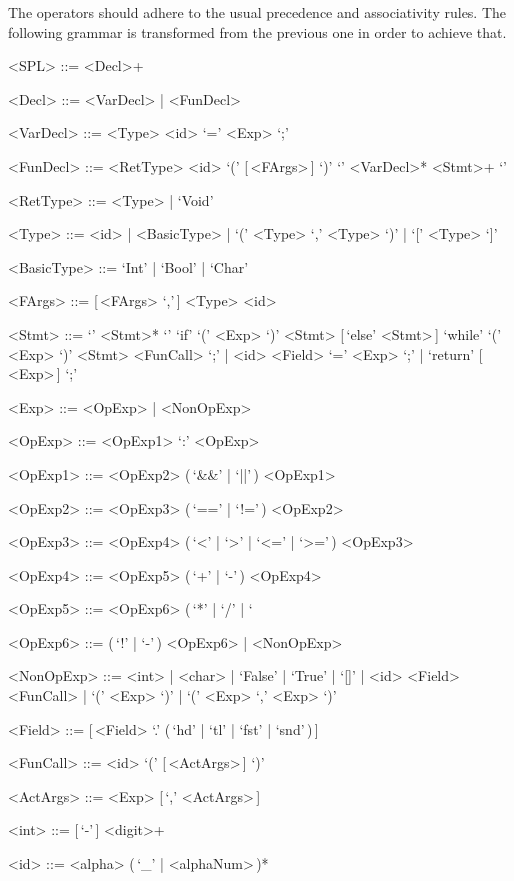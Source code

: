 \documentclass{article}
\begin{document}
The operators should adhere to the usual precedence and associativity rules.
The following grammar is transformed from the previous one in order to achieve that.
\setlength{\grammarindent}{7.1em}
\begin{grammar}
    <SPL> ::= <Decl>+

    <Decl> ::= <VarDecl> | <FunDecl>

    <VarDecl> ::= <Type> <id> `=' <Exp> `;'

    <FunDecl> ::= <RetType> <id> `(' [\,<FArgs>\,] `)' `{' <VarDecl>* <Stmt>+ `}'

    <RetType> ::= <Type> | `Void'

    <Type> ::= <id> | <BasicType> | `(' <Type> `,' <Type> `)' | `[' <Type> `]'

    <BasicType> ::= `Int' | `Bool' | `Char'

    <FArgs> ::= [\,<FArgs> `,'\,] <Type> <id>

    <Stmt> ::= `{' <Stmt>* `}'
    \alt `if' `(' <Exp> `)' <Stmt> [\,`else' <Stmt>\,]
    \alt `while' `(' <Exp> `)' <Stmt>
    \alt <FunCall> `;' | <id> <Field> `=' <Exp> `;' | `return' [\,<Exp>\,] `;'

    <Exp> ::= <OpExp> | <NonOpExp>

    <OpExp> ::= <OpExp1> `:' <OpExp>

    <OpExp1> ::= <OpExp2> (\,`&&' | `||'\,) <OpExp1>

    <OpExp2> ::= <OpExp3> (\,`==' | `!='\,) <OpExp2>

    <OpExp3> ::= <OpExp4> (\,`<' | `>' | `<=' | `>='\,) <OpExp3>

    <OpExp4> ::= <OpExp5> (\,`+' | `-'\,) <OpExp4>

    <OpExp5> ::= <OpExp6> (\,`*' | `/' | `%

    <OpExp6> ::= (\,`!' | `-'\,) <OpExp6> | <NonOpExp>

    <NonOpExp> ::= <int> | <char> | `False' | `True' | `[]' | <id> <Field>
    \alt <FunCall> | `(' <Exp> `)' | `(' <Exp> `,' <Exp> `)'

    <Field> ::= [\,<Field> `.' (\,`hd' | `tl' | `fst' | `snd'\,)\,]

    <FunCall> ::= <id> `(' [\,<ActArgs>\,] `)'

    <ActArgs> ::= <Exp> [\,`,' <ActArgs>\,]

    <int> ::= [\,`-'\,] <digit>+

    <id> ::= <alpha> (\,`_' | <alphaNum>\,)*
\end{grammar}
\end{document}
